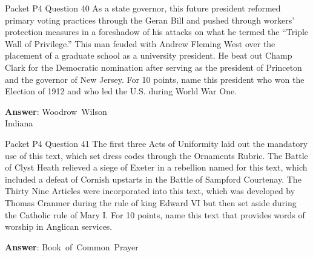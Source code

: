 \begin{frame}{Packet P4 Question 40}
As a state governor, this   future president reformed primary voting practices through the Geran Bill and pushed through workers’ protection measures in a foreshadow of his attacks on what he termed the “Triple Wall of Privilege.” This man feuded with Andrew Fleming West over the placement of a graduate school as a university president. He beat out Champ Clark for the Democratic nomination after serving as the president of Princeton and the governor of New Jersey. For 10 points, name this president       who won the Election of 1912 and who led the U.S. during World War One.

\textbf{Answer}: Woodrow\ Wilson\\
 Indiana
\end{frame}

\begin{frame}{Packet P4 Question 41}
The first three Acts of Uniformity laid out the mandatory use of this text, which set dress codes through the Ornaments Rubric. The Battle of Clyst Heath relieved a siege of Exeter in a rebellion named   for this text, which included a defeat of Cornish upstarts in the Battle of Sampford   Courtenay. The   Thirty Nine Articles were incorporated into this text, which   was developed by Thomas Cranmer during the rule of king Edward VI but then set aside during the Catholic rule of Mary I. For 10 points, name this text that provides words of worship in Anglican services.

\textbf{Answer}: Book\ of\ Common\ Prayer\\
\end{frame}

